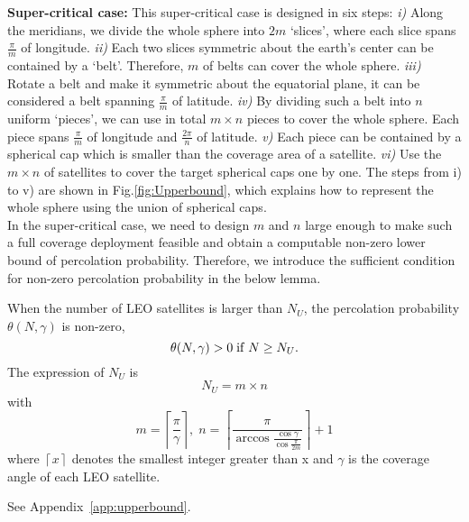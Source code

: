 \documentclass[final]{IEEEtran}
\begin{document}
\noindent \textbf{Super-critical case:} This super-critical case is designed in six steps: \textit{i)} Along the meridians, we divide the whole sphere into $2m$ `slices', where each slice spans $\frac{\pi}{m}$ of longitude. \textit{ii)} Each two slices symmetric about the earth's center can be contained by a `belt'. Therefore, $m$ of belts can cover the whole sphere. \textit{iii)} Rotate a belt and make it symmetric about the equatorial plane, it can be considered a belt spanning $\frac{\pi}{m}$ of latitude. \textit{iv)} By dividing such a belt into $n$ uniform `pieces', we can use in total $m\times n$ pieces to cover the whole sphere. Each piece spans $\frac{\pi}{m}$ of longitude and $\frac{2\pi}{n}$ of latitude. \textit{v)} Each piece can be contained by a spherical cap which is smaller than the coverage area of a satellite. \textit{vi)} Use the $m\times n$ of satellites to cover the target spherical caps one by one. The steps from i) to v) are shown in Fig.\ref{fig:Upperbound}, which explains how to represent the whole sphere using the union of spherical caps. 
\\
\indent In the super-critical case, we need to design $m$ and $n$ large enough to make such a full coverage deployment feasible and obtain a computable non-zero lower bound of percolation probability. Therefore, we introduce the sufficient condition for non-zero percolation probability in the below lemma.
\begin{lemma}\label{lem:upperbound1}
    When the number of LEO satellites is larger than $N_U$, the percolation probability $\theta(N,\gamma)$ is non-zero, \ie
\begin{equation}
    \theta(N,\gamma)>0\;{\rm if}\;N\geq N_U. 
\end{equation}    
    The expression of $N_U$ is 
\begin{equation}
    N_U = m\times n 
\label{upperbound}
\end{equation}
with
\begin{equation}
    m = \left \lceil \frac{\pi}{\gamma} \right \rceil,\;n= \left \lceil \frac{\pi}{\arccos{\frac{\cos\gamma}{\cos\frac{\pi}{2m}}}} \right \rceil +1
\label{upperboundmn}
\end{equation}
where $\left \lceil x \right \rceil$ denotes the smallest integer greater than x and $\gamma$ is the coverage angle of each LEO satellite.
\end{lemma}
\begin{IEEEproof}
    See Appendix~\ref{app:upperbound}. 
\end{IEEEproof}
\end{document}
